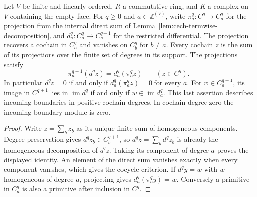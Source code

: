 \begin{lemma}\label{lem:cech-cycle-boundary-components}
Let $V$ be finite and linearly ordered, $R$ a commutative ring, and $K$
a complex on $V$ containing the empty face. For $q\geq 0$ and
$a\in\mathbb Z^{(V)}$, write $\pi_a^q:C^q\to C^q_a$ for the projection
from the internal direct sum of Lemma~\ref{lem:cech-termwise-decomposition},
and $d_a^q:C^q_a\to C^{q+1}_a$ for the restricted differential.
The projection recovers a cochain in $C^q_a$ and vanishes on $C^q_b$ for
$b\ne a$. Every cochain $z$ is the sum of its projections over the finite
set of degrees in its support. The projections satisfy
\[
  \pi_a^{q+1}(d^qz)=d_a^q(\pi_a^q z)
  \qquad(z\in C^q).
\]
In particular $d^qz=0$ if and only if $d_a^q(\pi_a^qz)=0$ for every $a$.
For $w\in C^{q+1}_a$, its image in $C^{q+1}$ lies in
$\operatorname{im}d^q$ if and only if $w\in\operatorname{im}d_a^q$.
This last assertion describes incoming boundaries in positive cochain
degrees. In cochain degree zero the incoming boundary module is zero.
\leanok
\end{lemma}
\begin{proof}
\leanok
Write $z=\sum_b z_b$ as its unique finite sum of homogeneous components.
Degree preservation gives $d^qz_b\in C^{q+1}_b$, so $d^qz=\sum_b d^qz_b$
is already the homogeneous decomposition of $d^qz$. Taking its component
of degree $a$ proves the displayed identity. An element of the direct sum
vanishes exactly when every component vanishes, which gives the cocycle
criterion. If $d^qy=w$ with $w$ homogeneous of degree $a$, projecting
gives $d_a^q(\pi_a^q y)=w$. Conversely a primitive in $C^q_a$ is also a
primitive after inclusion in $C^q$.
\end{proof}

